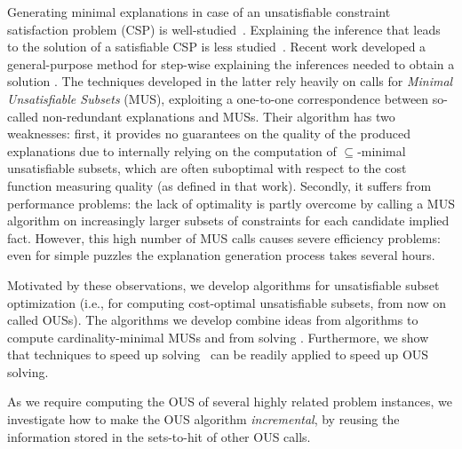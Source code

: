 

Generating minimal explanations in case of an unsatisfiable constraint satisfaction problem (CSP) is well-studied~\cite{junker2001quickxplain}. Explaining the inference that leads to the solution of a satisfiable CSP is less studied~\cite{sqalli1996inference,freuder2001explanation}. Recent work developed a general-purpose method for step-wise explaining the inferences needed to obtain a solution \cite{ecai/BogaertsGCG20}. 
The techniques developed in the latter rely heavily on calls for  \emph{Minimal Unsatisfiable Subsets} (MUS), exploiting a one-to-one correspondence between so-called non-redundant explanations and MUSs. 
Their algorithm has two weaknesses: first, it provides no guarantees on the quality of the produced explanations due to internally relying on the computation of $\subseteq$-minimal unsatisfiable subsets, which are often suboptimal with respect to the cost function measuring quality (as defined in that work). 
Secondly, it suffers from performance problems: the lack of optimality is partly overcome by calling a MUS algorithm on increasingly larger subsets of constraints for each candidate implied fact. %
However, this high number of MUS calls causes severe efficiency problems: even for simple puzzles the explanation generation process takes several hours.


Motivated by these observations, we develop algorithms for unsatisfiable subset optimization (i.e., for computing cost-optimal unsatisfiable subsets, from now on called OUSs). The algorithms we develop combine ideas from 
\hitsetbased algorithms to compute cardinality-minimal MUSs \cite{ignatiev2015smallest} and from \maxsat solving \cite{DBLP:conf/sat/DaviesB13}.
Furthermore, we show that techniques to speed up \hitsetbased \maxsat solving~\cite{davies} can be readily applied to speed up \hitsetbased OUS solving.

As we require computing the OUS of several highly related problem instances, 
we investigate how to make the OUS algorithm \emph{incremental}, by reusing the information stored in the sets-to-hit of other OUS calls.

